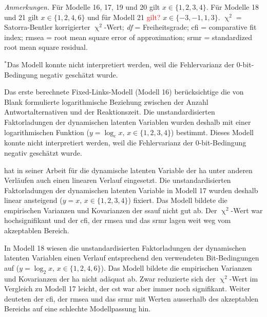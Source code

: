 \documentclass[11pt, twoside, a4paper]{book}		%
\begin{document}
\begin{table}[htb]
\begin{adjustbox}{width=1\textwidth, keepaspectratio}
\begin{threeparttable}
{\begin{tabular}
					
				\end{tabular}%
			}
			\begin{tablenotes}[flushleft]
				\footnotesize				%
				\setlength{}	%
				\item \textit{Anmerkungen.} Für Modelle 16, 17, 19 und 20 gilt $x\in\{1,2,3,4\}$. Für Modelle 18 und 21 gilt $x\in\{1,2,4,6\}$ und für Modell 21 \textcolor{red}{gilt?} $x\in\{-3,-1,1,3\}$. $\upchi^2 =$ Satorra-Bentler \citeyearpar{Satorra1994} korrigierter $\upchi^2$-Wert; \textit{df} = Freiheitsgrade; \gls{cfi} = comparative fit index; \gls{rmsea} = root mean square error of approximation; \gls{srmr} = standardized root mean square residual.
				\item {$^{*}$}Das Modell konnte nicht interpretiert werden, weil die Fehlervarianz der 0-bit-Bedingung negativ geschätzt wurde.
				
			\end{tablenotes}%
		\end{threeparttable}
	\end{adjustbox}	
\end{table}



Das erste berechnete Fixed-Links-Modell (Modell 16) berücksichtige die von Blank \citep[1934; zitiert nach][S. 103]{Jensen1987a} formulierte logarithmische Beziehung zwischen der Anzahl Antwortalternativen und der Reaktionszeit. Die unstandardisierten Faktorladungen der dynamischen latenten Variablen wurden deshalb mit einer logarithmischen Funktion ($y=\log_{e}x,\,x\in\{1, 2, 3, 4\}$) bestimmt. Dieses Modell konnte nicht interpretiert werden, weil die Fehlervarianz der 0-bit-Bedingung negativ geschätzt wurde.

\citet{Schweizer2006a} hat in seiner Arbeit für die dynamische latenten Variable der \gls{ha} unter anderen Verläufen auch einen linearen Verlauf eingesetzt. 
Die unstandardisierten Faktorladungen der dynamischen latenten Variable in Modell 17 wurden deshalb linear ansteigend ($y=x,\,x\in\{1, 2, 3, 4\}$) fixiert. Das Modell bildete die empirischen Varianzen und Kovarianzen der \gls{ssauf} nicht gut ab. Der $\upchi^2$-Wert war hochsignifikant und der \gls{cfi}, der \gls{rmsea} und das \gls{srmr} lagen weit weg vom akzeptablen Bereich.

In Modell 18 wiesen die unstandardisierten Faktorladungen der dynamischen latenten Variablen einen Verlauf entsprechend den verwendeten Bit-Bedingungen auf ($y=\log_{2}x,\,x\in\{1, 2, 4, 6\}$). Das Modell bildete die empirischen Varianzen und Kovarianzen der \gls{ha} nicht adäquat ab. Zwar reduzierte sich der $\upchi^2$-Wert im Vergleich zu Modell 17 leicht, der \gls{cst} war aber immer noch signifikant. Weiter deuteten der \gls{cfi}, der \gls{rmsea} und das \gls{srmr} mit Werten ausserhalb des akzeptablen Bereichs auf eine schlechte Modellpassung hin.
\end{document}
